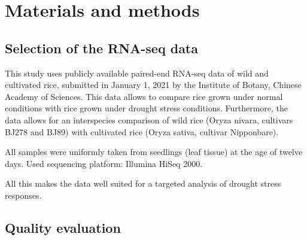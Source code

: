 \section{Materials and methods}

\subsection{Selection of the RNA-seq data}

This study uses publicly available paired-end RNA-seq data of wild and cultivated rice, submitted in January 1, 2021 by the Institute of Botany, Chinese Academy of Sciences. This data allows to compare rice grown under normal conditions with rice grown under drought stress conditions. Furthermore, the data allows for an interspecies comparison of wild rice (Oryza nivara, cultivars BJ278 and BJ89) with cultivated rice (Oryza sativa, cultivar Nipponbare).

All samples were uniformly taken from seedlings (leaf tissue) at the age of twelve days. Used sequencing platform: Illumina HiSeq 2000.

All this makes the data well suited for a targeted analysis of drought stress responses.


\subsection{Quality evaluation}

